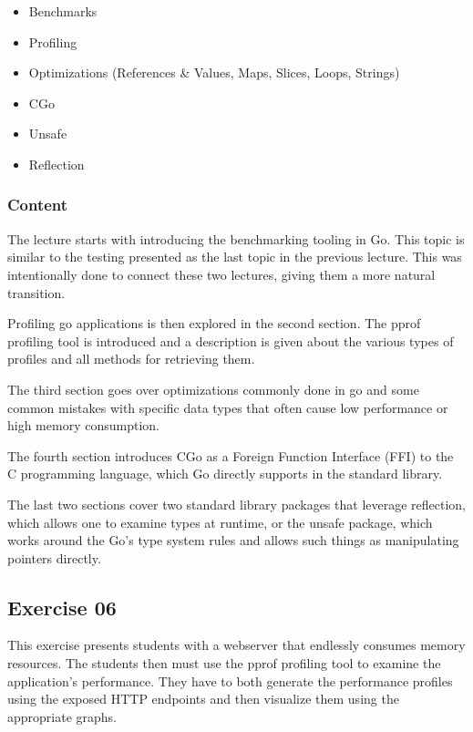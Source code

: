 \documentclass[
  digital,
  color,
  oneside,
  nosansbold,
  nocolorbold,
  nolof,
  nolot,
]{fithesis4}
\begin{document}
\begin{itemize}
    \item Benchmarks
    \item Profiling
    \item Optimizations (References \& Values, Maps, Slices, Loops, Strings)
    \item CGo
    \item Unsafe
    \item Reflection
\end{itemize}

\subsubsection{Content}

The lecture starts with introducing the benchmarking tooling in Go. This topic is similar to the testing presented as the last topic in the previous lecture. This was intentionally done to connect these two lectures, giving them a more natural transition.

Profiling go applications is then explored in the second section. The pprof profiling tool is introduced and a description is given about the various types of profiles and all methods for retrieving them.

The third section goes over optimizations commonly done in go and some common mistakes with specific data types that often cause low performance or high memory consumption.

The fourth section introduces CGo as a Foreign Function Interface (FFI) to the C programming language, which Go directly supports in the standard library.

The last two sections cover two standard library packages that leverage reflection, which allows one to examine types at runtime, or the unsafe package, which works around the Go's type system rules and allows such things as manipulating pointers directly.

\subsection{Exercise 06}

This exercise presents students with a webserver that endlessly consumes memory resources. The students then must use the pprof profiling tool to examine the application's performance. They have to both generate the performance profiles using the exposed HTTP endpoints and then visualize them using the appropriate graphs.
\end{document}

